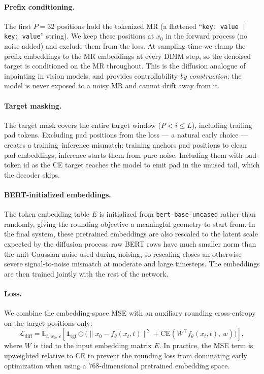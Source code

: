 \documentclass{llncs}
\begin{document}
\paragraph{Prefix conditioning.}
The first $P\!=\!32$ positions hold the tokenized MR (a flattened
``\texttt{key: value | key: value}'' string). We keep these positions at
$x_0$ in the forward process (no noise added) and exclude them from the
loss. At sampling time we clamp the prefix embeddings to the MR embeddings
at every DDIM step, so the denoised target is conditioned on the MR
throughout. This is the diffusion analogue of inpainting in vision models,
and provides controllability \emph{by construction}: the model is never
exposed to a noisy MR and cannot drift away from it.

\paragraph{Target masking.}
The target mask covers the entire target window ($P\!<\!i\!\le\!L$),
including trailing pad tokens. Excluding pad positions from the loss --- a
natural early choice --- creates a training--inference mismatch: training
anchors pad positions to clean pad embeddings, inference starts them from
pure noise. Including them with pad-token id as the CE target teaches the
model to emit pad in the unused tail, which the decoder skips.

\paragraph{BERT-initialized embeddings.}
The token embedding table $E$ is initialized from
\texttt{bert-base-uncased} \cite{devlin2019bert} rather than randomly,
giving the rounding objective a meaningful geometry to start from. In the
final system, these pretrained embeddings are also rescaled to the latent
scale expected by the diffusion process: raw BERT rows have much smaller
norm than the unit-Gaussian noise used during noising, so rescaling closes
an otherwise severe signal-to-noise mismatch at moderate and large
timesteps. The embeddings are then trained jointly with the rest of the
network.

\paragraph{Loss.}
We combine the embedding-space MSE with an auxiliary rounding
cross-entropy on the target positions only:
\begin{equation}
  \mathcal{L}_{\text{diff}}
  = \mathbb{E}_{t,\,x_0,\,\epsilon}\!\left[
      \mathbf{1}_{\text{tgt}} \odot \big( \|x_0 - f_\theta(x_t,t)\|^2
      + \mathrm{CE}(W^\top f_\theta(x_t,t),\, w) \big)
    \right],
\end{equation}
where $W$ is tied to the input embedding matrix $E$.
In practice, the MSE term is upweighted relative to CE to prevent the
rounding loss from dominating early optimization when using a 768-dimensional
pretrained embedding space.
\end{document}
